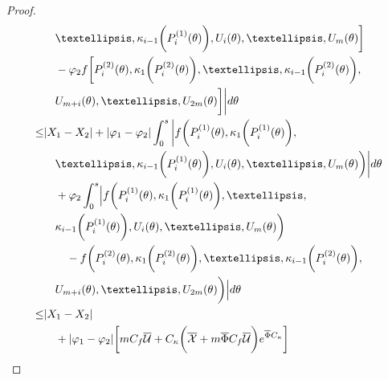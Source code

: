 \documentclass[10pt,a4paper]{amsart}
\begin{document}
\begin{proof}
\begin{align}
            & \quad \dots, \kappa_{i-1} \bigg( P_i^{(1)}(\theta) \bigg), U_i(\theta), \dots, U_m(\theta) \bigg] \nonumber \\
            & \quad - \varphi_2 f \bigg[ P_i^{(2)}(\theta), \kappa_1 \bigg( P_i^{(2)}(\theta) \bigg), \dots, \kappa_{i-1} \bigg( P_i^{(2)}(\theta) \bigg), \nonumber \\ 
            & \quad U_{m+i}(\theta), \dots, U_{2m}(\theta) \bigg] \bigg| d\theta \nonumber \\
        \leq& |X_1 - X_2|+ |\varphi_1 - \varphi_2| \int_{0}^s \bigg| f \bigg( P_i^{(1)}(\theta), \kappa_1 \bigg( P_i^{(1)}(\theta) \bigg),\nonumber \\ 
            & \quad \dots, \kappa_{i-1} \bigg( P_i^{(1)}(\theta) \bigg), U_i(\theta), \dots, U_m(\theta) \bigg) \bigg| d\theta \nonumber \\
            &\quad + \varphi_2 \int_{0}^s \Bigl| f \bigg( P_i^{(1)}(\theta), \kappa_1 \bigg( P_i^{(1)}(\theta) \bigg), \dots,\nonumber \\ 
            & \quad \kappa_{i-1} \bigg( P_i^{(1)}(\theta) \bigg), U_i(\theta), \dots, U_m(\theta) \bigg) \nonumber \\
            &\qquad - f \bigg( P_i^{(2)}(\theta), \kappa_1 \bigg( P_i^{(2)}(\theta) \bigg), \dots, \kappa_{i-1} \bigg( P_i^{(2)}(\theta) \bigg), \nonumber \\ 
            & \quad U_{m+i}(\theta), \dots, U_{2m}(\theta) \bigg) \Bigr| d\theta \nonumber \\
        \leq& |X_1 - X_2| \nonumber \\
            &\quad + |\varphi_1 - \varphi_2| \bigg[ m C_f \overline{\mathcal{U}} + C_{\kappa} \bigg( \overline{\mathcal{X}} + m \overline{\Phi} C_f \overline{\mathcal{U}} \bigg) e^{\overline{\Phi} C_{\kappa}} \bigg] \nonumber \\

\end{align}
\end{proof}
\end{document}

